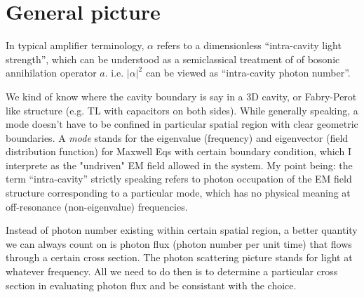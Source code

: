 \documentclass{article}
\begin{document}
%








\section{General picture}

In typical amplifier terminology, $\alpha$ refers to a dimensionless “intra-cavity light strength”, which can be understood as a semiclassical treatment of of bosonic annihilation operator $a$. i.e. $|\alpha|^2$ can be viewed as “intra-cavity photon number”. 

We kind of know where the cavity boundary is say in a 3D cavity, or Fabry-Perot like structure (e.g. TL with capacitors on both sides). While generally speaking, a mode doesn't have to be confined in particular spatial region with clear geometric boundaries. A \emph{mode} stands for the eigenvalue (frequency) and eigenvector (field distribution function) for Maxwell Eqs with certain boundary condition, which I interprete as the "undriven" EM field allowed in the system. My point being: the term “intra-cavity” strictly speaking refers to photon occupation of the EM field structure corresponding to a particular mode, which has no physical meaning at off-resonance (non-eigenvalue) frequencies. 

Instead of photon number existing within certain spatial region, a better quantity we can always count on is photon flux (photon number per unit time) that flows through a certain cross section. The photon scattering picture stands for light at whatever frequency. All we need to do then is to determine a particular cross section in evaluating photon flux and be consistant with the choice. 
\end{document}
